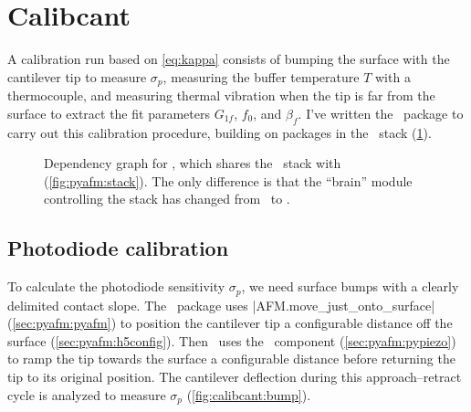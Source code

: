 \section{Calibcant}
\label{sec:calibcant:procedure}

A calibration run based on \cref{eq:kappa} consists of bumping the
surface with the cantilever tip to measure $\sigma_p$, measuring the
buffer temperature $T$ with a thermocouple, and measuring thermal
vibration when the tip is far from the surface to extract the fit
parameters $G_{1f}$, $f_0$, and $\beta_f$.  I've written the
\calibcant\ package to carry out this calibration procedure, building
on packages in the \pyafm\ stack (\cref{fig:calibcant:stack}).

\begin{figure}
  \caption{Dependency graph for \calibcant, which shares the
    \pyafm\ stack with \unfoldprotein (\cref{fig:pyafm:stack}).  The
    only difference is that the ``brain'' module controlling the stack
    has changed from \unfoldprotein\ to
    \calibcant.\label{fig:calibcant:stack}}
\end{figure}

\subsection{Photodiode calibration}
\label{sec:calibcant:bump}

To calculate the photodiode sensitivity $\sigma_p$, we need surface
bumps with a clearly delimited contact slope.  The \calibcant\ package
uses |AFM.move_just_onto_surface|
(\cref{sec:pyafm:pyafm}) to position the cantilever tip a configurable
distance off the surface (\cref{sec:pyafm:h5config}).  Then
\calibcant\ uses the \pypiezo\ component (\cref{sec:pyafm:pypiezo}) to
ramp the tip towards the surface a configurable distance before
returning the tip to its original position.  The cantilever deflection
during this approach--retract cycle is analyzed to measure $\sigma_p$
(\cref{fig:calibcant:bump}).

